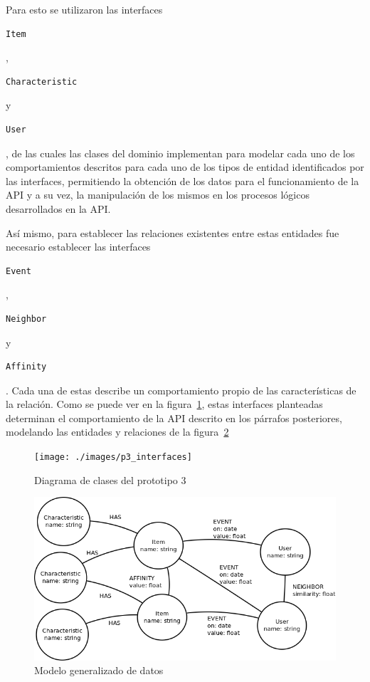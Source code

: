   Para esto se utilizaron las interfaces \begin{verbatim}Item\end{verbatim}, \begin{verbatim}Characteristic\end{verbatim} y \begin{verbatim}User\end{verbatim}, de las cuales las clases del dominio implementan para modelar cada uno de los comportamientos descritos para cada uno de los tipos de entidad identificados por las interfaces, permitiendo la obtención de los datos para el funcionamiento de la API y a su vez, la manipulación de los mismos en los procesos lógicos desarrollados en la API.

  Así mismo, para establecer las relaciones existentes entre estas entidades fue necesario establecer las interfaces \begin{verbatim}Event\end{verbatim}, \begin{verbatim}Neighbor\end{verbatim} y \begin{verbatim}Affinity\end{verbatim}. Cada una de estas describe un comportamiento propio de las características de la relación. Como se puede ver en la figura~\ref{fig:p3_interfaces}, estas interfaces planteadas determinan el comportamiento de la API descrito en los párrafos posteriores, modelando las entidades y relaciones de la figura~\ref{fig:general_model}

    \begin{figure}[h!]
      \centering
      \texttt{[image: ./images/p3\_interfaces]}
      \caption{Diagrama de clases del prototipo 3}
      \label{fig:p3_interfaces}
    \end{figure}

    \begin{figure}[h!]
      \centering
      \includegraphics[width=16cm]{./images/general_data_model}
      \caption{Modelo generalizado de datos}
      \label{fig:general_model}
    \end{figure}

